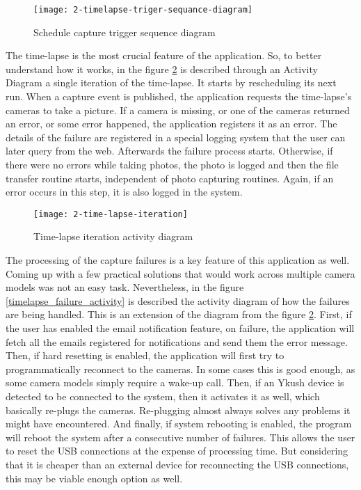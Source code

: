 \begin{figure}[!ht]
\centering
\texttt{[image: 2-timelapse-triger-sequance-diagram]}
\caption{Schedule capture trigger sequence diagram}\label{timelapse_triger_sequence}
\end{figure}

The time-lapse is the most crucial feature of the application. So, to better understand how it works, in the figure \mbox{\ref{timelapse_iteration_activity}} is described through an Activity Diagram a single iteration of the time-lapse. It starts by rescheduling its next run. When a capture event is published, the application requests the time-lapse's cameras to take a picture. If a camera is missing, or one of the cameras returned an error, or some error happened, the application registers it as an error. The details of the failure are registered in a special logging system that the user can later query from the web. Afterwards the failure process starts. Otherwise, if there were no errors while taking photos, the photo is logged and then the file transfer routine starts, independent of photo capturing routines. Again, if an error occurs in this step, it is also logged in the system.

\begin{figure}[!ht]
\centering
\texttt{[image: 2-time-lapse-iteration]}
\caption{Time-lapse iteration activity diagram}\label{timelapse_iteration_activity}
\end{figure}

The processing of the capture failures is a key feature of this application as well. Coming up with a few practical solutions that would work across multiple camera models was not an easy task. Nevertheless, in the figure \mbox{\ref{timelapse_failure_activity}} is described the activity diagram of how the failures are being handled. This is an extension of the diagram from the figure \mbox{\ref{timelapse_iteration_activity}}. First, if the user has enabled the email notification feature, on failure, the application will fetch all the emails registered for notifications and send them the error message. Then, if hard resetting is enabled, the application will first try to programmatically reconnect to the cameras. In some cases this is good enough, as some camera models simply require a wake-up call. Then, if an Ykush device is detected to be connected to the system, then it activates it as well, which basically re-plugs the cameras. Re-plugging almost always solves any problems it might have encountered. And finally, if system rebooting is enabled, the program will reboot the system after a consecutive number of failures. This allows the user to reset the USB connections at the expense of processing time. But considering that it is cheaper than an external device for reconnecting the USB connections, this may be viable enough option as well.

